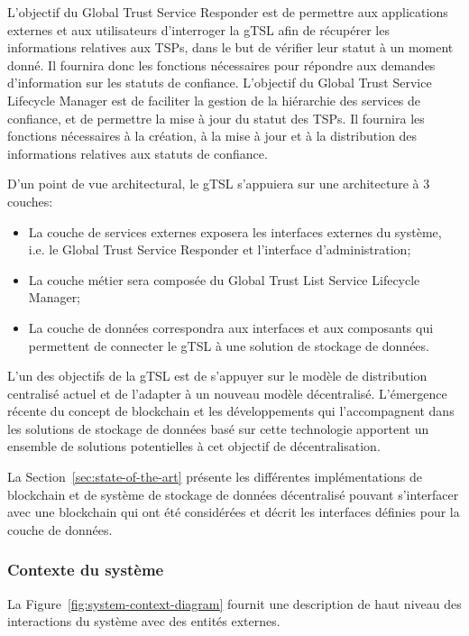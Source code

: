 \documentclass{tnreport}
\begin{document}

L'objectif du Global Trust Service Responder est de permettre aux applications externes et aux utilisateurs d'interroger la gTSL afin de récupérer les informations relatives aux TSPs, dans le but de vérifier leur statut à un moment donné. 
Il fournira donc les fonctions nécessaires pour répondre aux demandes d'information sur les statuts de confiance.
L'objectif du Global Trust Service Lifecycle Manager est de faciliter la gestion de la hiérarchie des services de confiance, et de permettre la mise à jour du statut des TSPs.
Il fournira les fonctions nécessaires à la création, à la mise à jour et à la distribution des informations relatives aux statuts de confiance.

D'un point de vue architectural, le gTSL s'appuiera sur une architecture à 3 couches:
\begin{itemize}
	\item La couche de services externes exposera les interfaces externes du système, i.e. le Global Trust Service Responder et l'interface d'administration;
	\item La couche métier sera composée du Global Trust List Service Lifecycle Manager;
	\item La couche de données correspondra aux interfaces et aux composants qui permettent de connecter le gTSL à une solution de stockage de données.
\end{itemize}
L'un des objectifs de la gTSL est de s'appuyer sur le modèle de distribution centralisé actuel et de l'adapter à un nouveau modèle décentralisé.
L'émergence récente du concept de blockchain et les développements qui l'accompagnent dans les solutions de stockage de données basé sur cette technologie apportent un ensemble de solutions potentielles à cet objectif de décentralisation.

La Section~\ref{sec:state-of-the-art} présente les différentes implémentations de blockchain et de système de stockage de données décentralisé pouvant s'interfacer avec une blockchain qui ont été considérées et décrit les interfaces définies pour la couche de données.

\subsubsection{Contexte du système}

La Figure~\ref{fig:system-context-diagram} fournit une description de haut niveau des interactions du système avec des entités externes.
\end{document}
